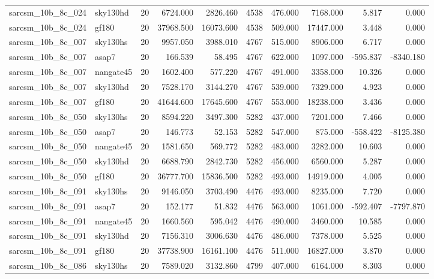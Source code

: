 \begin{longtable}{llrrrrrrrr}
sarcsm\_10b\_8c\_024 & sky130hd & 20 & 6724.000 & 2826.460 & 4538 & 476.000 & 7168.000 & 5.817 & 0.000 \\
sarcsm\_10b\_8c\_024 & gf180 & 20 & 37968.500 & 16073.600 & 4538 & 509.000 & 17447.000 & 3.448 & 0.000 \\
sarcsm\_10b\_8c\_007 & sky130hs & 20 & 9957.050 & 3988.010 & 4767 & 515.000 & 8906.000 & 6.717 & 0.000 \\
sarcsm\_10b\_8c\_007 & asap7 & 20 & 166.539 & 58.495 & 4767 & 622.000 & 1097.000 & -595.837 & -8340.180 \\
sarcsm\_10b\_8c\_007 & nangate45 & 20 & 1602.400 & 577.220 & 4767 & 491.000 & 3358.000 & 10.326 & 0.000 \\
sarcsm\_10b\_8c\_007 & sky130hd & 20 & 7528.170 & 3144.270 & 4767 & 539.000 & 7329.000 & 4.923 & 0.000 \\
sarcsm\_10b\_8c\_007 & gf180 & 20 & 41644.600 & 17645.600 & 4767 & 553.000 & 18238.000 & 3.436 & 0.000 \\
sarcsm\_10b\_8c\_050 & sky130hs & 20 & 8594.220 & 3497.300 & 5282 & 437.000 & 7201.000 & 7.466 & 0.000 \\
sarcsm\_10b\_8c\_050 & asap7 & 20 & 146.773 & 52.153 & 5282 & 547.000 & 875.000 & -558.422 & -8125.380 \\
sarcsm\_10b\_8c\_050 & nangate45 & 20 & 1581.650 & 569.772 & 5282 & 483.000 & 3282.000 & 10.603 & 0.000 \\
sarcsm\_10b\_8c\_050 & sky130hd & 20 & 6688.790 & 2842.730 & 5282 & 456.000 & 6560.000 & 5.287 & 0.000 \\
sarcsm\_10b\_8c\_050 & gf180 & 20 & 36777.700 & 15836.500 & 5282 & 493.000 & 14919.000 & 4.005 & 0.000 \\
sarcsm\_10b\_8c\_091 & sky130hs & 20 & 9146.050 & 3703.490 & 4476 & 493.000 & 8235.000 & 7.720 & 0.000 \\
sarcsm\_10b\_8c\_091 & asap7 & 20 & 152.177 & 51.832 & 4476 & 563.000 & 1061.000 & -592.407 & -7797.870 \\
sarcsm\_10b\_8c\_091 & nangate45 & 20 & 1660.560 & 595.042 & 4476 & 490.000 & 3460.000 & 10.585 & 0.000 \\
sarcsm\_10b\_8c\_091 & sky130hd & 20 & 7156.310 & 3006.630 & 4476 & 486.000 & 7378.000 & 5.525 & 0.000 \\
sarcsm\_10b\_8c\_091 & gf180 & 20 & 37738.900 & 16161.100 & 4476 & 511.000 & 16827.000 & 3.870 & 0.000 \\
sarcsm\_10b\_8c\_086 & sky130hs & 20 & 7589.020 & 3132.860 & 4799 & 407.000 & 6164.000 & 8.303 & 0.000 \\

\end{longtable}
